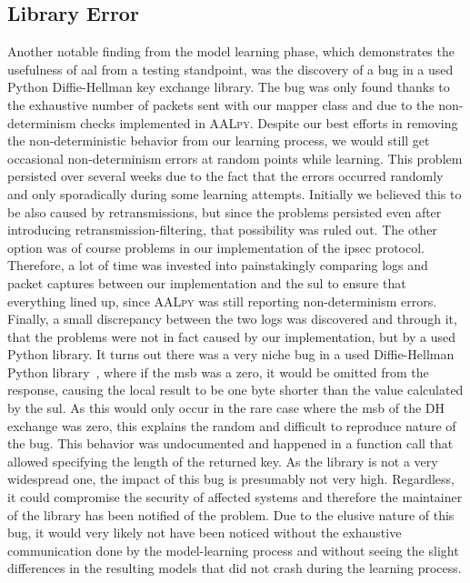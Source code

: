 \subsection{Library Error} \label{subsec:liberror}
Another notable finding from the model learning phase, which demonstrates the usefulness of \ac{aal} from a testing standpoint, was the discovery of a bug in a used Python Diffie-Hellman key exchange library. The bug was only found thanks to the exhaustive number of packets sent with our mapper class and due to the non-determinism checks implemented in \textsc{AALpy}. Despite our best efforts in removing the non-deterministic behavior from our learning process, we would still get occasional non-determinism errors at random points while learning. This problem persisted over several weeks due to the fact that the errors occurred randomly and only sporadically during some learning attempts. Initially we believed this to be also caused by retransmissions, but since the problems persisted even after introducing retransmission-filtering, that possibility was ruled out. The other option was of course problems in our implementation of the \ac{ipsec} protocol. Therefore, a lot of time was invested into painstakingly comparing logs and packet captures between our implementation and the \ac{sul} to ensure that everything lined up, since \textsc{AALpy} was still reporting non-determinism errors. Finally, a small discrepancy between the two logs was discovered and through it, that the problems were not in fact caused by our implementation, but by a used Python library. It turns out there was a very niche bug in a used Diffie-Hellman Python library~\cite{topdappdh}, where if the \ac{msb} was a zero, it would be omitted from the response, causing the local result to be one byte shorter than the value calculated by the \ac{sul}. As this would only occur in the rare case where the \ac{msb} of the DH exchange was zero, this explains the random and difficult to reproduce nature of the bug. This behavior was undocumented and happened in a function call that allowed specifying the length of the returned key. As the library is not a very widespread one, the impact of this bug is presumably not very high. Regardless, it could compromise the security of affected systems and therefore the maintainer of the library has been notified of the problem. Due to the elusive nature of this bug, it would very likely not have been noticed without the exhaustive communication done by the model-learning process and without seeing the slight differences in the resulting models that did not crash during the learning process.

